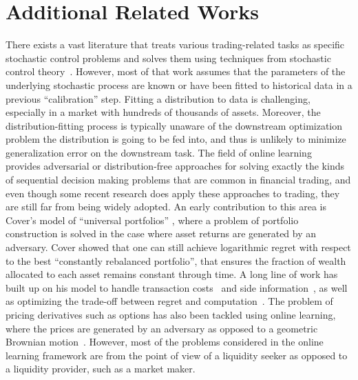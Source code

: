 \documentclass[final,12pt]{colt2025}
\begin{document}
\section{Additional Related Works}
\label{sec:additional}
There exists a vast literature that treats various trading-related tasks as specific stochastic control problems and solves them using techniques from stochastic control theory~\citep{shreve2004stochastic,shreve2005stochastic,cartea2015algorithmic,gatheral2011volatility}. However, most of that work assumes that the parameters of the underlying stochastic process are known or have been fitted to historical data in a previous ``calibration'' step. 
%
Fitting a distribution to data is challenging, especially in a market with hundreds of thousands of assets. Moreover, the distribution-fitting process is typically unaware of the downstream optimization problem the distribution is going to be fed into, and thus is unlikely to minimize generalization error on the downstream task. The field of online learning~\citep{10.5555/1137817,shalev2012online,hazan2016introduction,orabona2019modern} provides adversarial or distribution-free approaches for solving exactly the kinds of sequential decision making problems that are common in financial trading, and even though some recent research does apply these approaches to trading, they are still far from being widely adopted. 
%
An early contribution to this area is Cover's model of ``universal portfolios'' \citep{coverUniversalPortfolios1991}, where a problem of portfolio construction is solved in the case where asset returns are generated by an adversary. Cover showed that one can still achieve logarithmic regret with respect to the best ``constantly rebalanced portfolio'', that ensures the fraction of wealth allocated to each asset remains constant through time. A long line of work has built up on his model to handle transaction costs~\citep{blum1997universal} and side information~\citep{cover1996universal}, as well as optimizing the trade-off between regret and computation~\citep{helmbold1998line,borodin2000competitive,borodin2003can,zimmert2022pushing}. The problem of pricing derivatives such as options has also been tackled using online learning, where the prices are generated by an adversary as opposed to a geometric Brownian motion~\citep{demarzo2006online,abernethy2012minimax,abernethy2013hedge}.
%
However, most of the problems considered in the online learning framework are from the point of view of a liquidity seeker as opposed to a liquidity provider, such as a market maker. 
\end{document}
